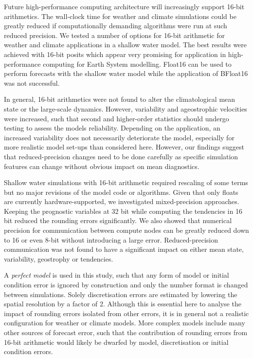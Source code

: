 Future high-performance computing architecture will increasingly support 16-bit arithmetics. The wall-clock time for weather and climate
simulations could be greatly reduced if computationally demanding algorithms were run at such reduced precision. We tested a number
of options for 16-bit arithmetic for weather and climate applications in a shallow water model. The best results were achieved with 16-bit
posits which appear very promising for application in high-performance computing for Earth System modelling. Float16 can be used to
perform forecasts with the shallow water model while the application of BFloat16 was not successful.

In general, 16-bit arithmetics were not found to alter the climatological mean state or the large-scale dynamics. However, 
variability and ageostrophic velocities were increased, such that second and higher-order statistics should undergo testing
to assess the models reliability. Depending on the application, an increased variability does not  necessarily deteriorate the
model, especially for more realistic model set-ups than considered here. However, our findings suggest that reduced-precision
changes need to be done carefully as specific simulation features can change without obvious impact on mean diagnostics.

Shallow water simulations with 16-bit arithmetic required rescaling of some terms but no major revisions of the model code
or algorithms. Given that only floats are currently hardware-supported, we investigated mixed-precision approaches.
Keeping the prognostic variables at 32 bit while computing the tendencies in 16 bit reduced the rounding errors significantly.
We also showed that numerical precision for communication between compute nodes can be greatly reduced down to 16 or
even 8-bit without introducing a large error. Reduced-precision communication was not found to have a significant impact on
either mean state, variability, geostrophy or tendencies.

A \emph{perfect model} is used in this study, such that any form of model or initial condition error is ignored by construction
and only the number format is changed between simulations. Solely discretisation errors are estimated by lowering the spatial
resolution by a factor of 2. Although this is essential here to analyse the impact of rounding errors isolated from other errors,
it is in general not a realistic configuration for weather or climate models. More complex models include many other sources
of forecast error, such that the contribution of rounding errors from 16-bit arithmetic would likely be dwarfed by model, discretisation
or initial condition errors.

